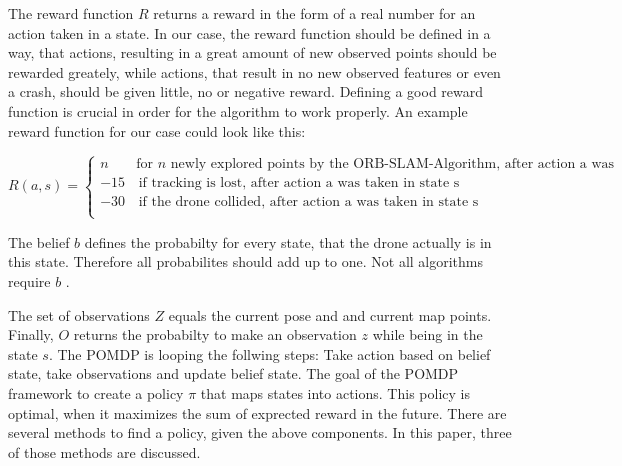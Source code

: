 	The reward function $R$ returns a reward in the form of a real number for an action taken in a state. In our case, the reward function should be defined in a way, that actions, resulting 
	in a great amount of new observed points should be rewarded greately, while actions, that result in no new observed features or even a crash, should be given little, no or negative reward. 
	Defining a good reward function is crucial in order for the algorithm to work properly. An example reward function for our case could look like this: 
	
	$$R(a,s) = \left\{
\begin{array}{ll}
n & \textrm{for } n \textrm{ newly explored points by the ORB-SLAM-Algorithm, after action a was taken in state s} \\
-15 & \, \textrm{if tracking is lost, after action a was taken in state s}  \\
-30 & \, \textrm{if the drone collided, after action a was taken in state s}  \\
\end{array}
\right. $$
	
	The belief $b$ defines the probabilty for every state, that the drone actually is in this state. Therefore all probabilites should add up to one. Not all algorithms 
	require $b$ \cite{belief}.
	
	The set of observations $Z$ equals the current pose and and current map points. Finally, $O$ returns the probabilty to make an observation $z$ while being in the state $s$.
	The POMDP is looping the follwing steps: Take action based on belief state, take observations and update belief state. The goal of the POMDP framework to 
	create a policy $\pi$ that maps states into actions. This policy is optimal, when it maximizes the sum of exprected reward in the future. There are several 
	methods to find a policy, given the above components. In this paper, three of those methods are discussed. 
	

